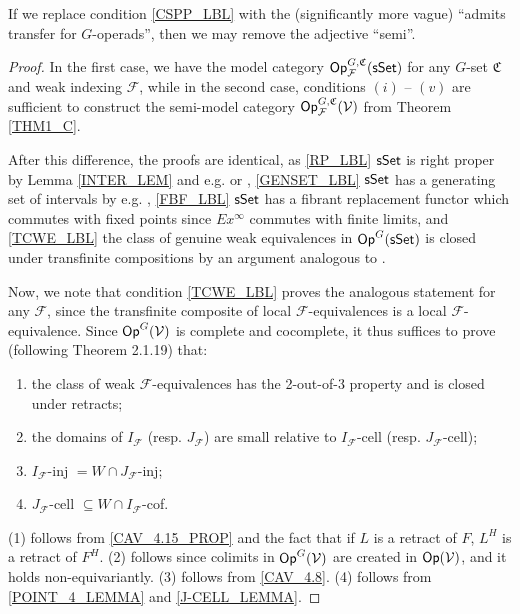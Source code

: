 \documentclass[a4paper,10pt
,draft
]{article}%
\renewcommand{\F}{\mathcal F}
\renewcommand{\1}{\ensuremath{\mathbb{id}}}
\begin{document}
\begin{theorem}
      If we replace condition \ref{CSPP_LBL} with the (significantly more vague) ``admits transfer for $G$-operads'',
      then we may remove the adjective ``semi''.
\end{theorem}

\begin{proof}
      In the first case, we have the model category $\Op^{G,\mathfrak C}_\F(\sSet)$
      for any $G$-set $\mathfrak C$ and weak indexing $\F$,
      while in the second case, conditions $(i)$ -- $(v)$ are sufficient to construct the
      semi-model category $\Op^{G, \mathfrak C}_\F(\V)$ from Theorem \ref{THM1_C}. 
      
      After this difference, the proofs are identical,
      as
      \ref{RP_LBL} $\mathsf{sSet}$ is right proper
      by Lemma \ref{INTER_LEM} and e.g. \cite[Prop 2.1.5]{Cis06} or \cite[Lemma 1.12]{BM13},
      \ref{GENSET_LBL} $\mathsf{sSet}$ has a generating set of intervals
      by e.g. \cite[Lemma 1.12]{BM13},
      \ref{FBF_LBL} $\mathsf{sSet}$ has a fibrant replacement functor which commutes with fixed points
      since $Ex^{\infty}$ commutes with finite limits, and
      \ref{TCWE_LBL} the class of genuine weak equivalences in $\mathsf{Op}^G(\mathsf{sSet})$ is closed under transfinite compositions
      by an argument analogous to \cite[Lemma 1.24]{CM13b}.

      Now, we note that condition \ref{TCWE_LBL} proves the analogous statement for any $\F$,
      since the transfinite composite of local $\F$-equivalences is a local $\F$-equivalence.
      Since $\mathsf{Op}^G(\mathcal V)$ is complete and cocomplete, it thus suffices to prove (following \cite{Hov98} Theorem 2.1.19) that:
      \begin{enumerate}[label = (\arabic*)]
      \item the class of weak $\F$-equivalences has the 2-out-of-3 property and is closed under retracts;
      \item the domains of $I_{\F}$ (resp. $J_{\F}$) are small relative to $I_{\F}$-cell (resp. $J_{\F}$-cell);
      \item $I_{\F}$-inj $= W\cap J_{\F}$-inj;
      \item $J_{\F}$-cell $\subseteq W\cap I_{\F}$-cof.
      \end{enumerate}
      (1) follows from \ref{CAV_4.15_PROP} and the fact that if $L$ is a retract of $F$, $L^H$ is a retract of $F^H$.
      (2) follows since colimits in $\mathsf{Op}^G(\mathcal V)$ are created in $\mathsf{Op}(\mathcal V)$, and it holds non-equivariantly.
      (3) follows from \ref{CAV_4.8}.
      (4) follows from \ref{POINT_4_LEMMA} and \ref{J-CELL_LEMMA}.
\end{proof}
\end{document}
